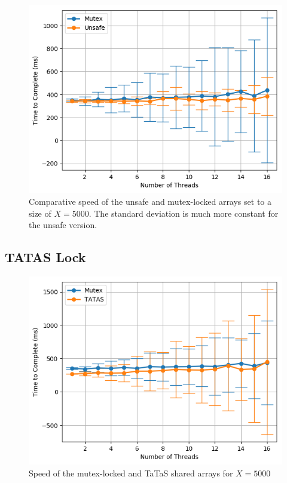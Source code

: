\documentclass[11pt]{article}
\begin{document}
\begin{figure}
\centering
\includegraphics[scale=0.65]{step3_3.png}
\caption{Comparative speed of the unsafe and mutex-locked arrays set to a size of $X=5000$. The standard deviation is much more constant for the unsafe version.}
\label{fig:step3_3} 
\end{figure}


\subsection{TATAS Lock}

\begin{figure}
\centering
\includegraphics[scale=0.65]{step4_1.png}
\caption{Speed of the mutex-locked and TaTaS shared arrays for $X=5000$}
\label{fig:step4_1}
\end{figure}
\end{document}
